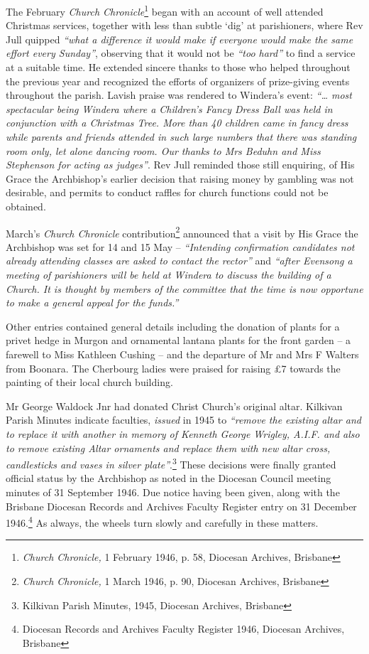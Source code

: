 The February \emph{Church Chronicle}\footnote{\emph{Church Chronicle,} 1 February 1946, p. 58, Diocesan Archives, Brisbane} began with an account of well attended Christmas services, together with less than subtle `dig' at parishioners, where Rev Jull quipped \emph{``what a difference it would make if everyone would make the same effort every Sunday''}, observing that it would not be \emph{``too hard''} to find a service at a suitable time. He extended sincere thanks to those who helped throughout the previous year and recognized the efforts of organizers of prize-giving events throughout the parish. Lavish praise was rendered to Windera's event: \emph{``\ldots{} most spectacular being Windera where a Children's Fancy Dress Ball was held in conjunction with a Christmas Tree. More than 40 children came in fancy dress while parents and friends attended in such large numbers that there was standing room only, let alone dancing room. Our thanks to Mrs Beduhn and Miss Stephenson for acting as judges''}. Rev Jull reminded those still enquiring, of His Grace the Archbishop's earlier decision that raising money by gambling was not desirable, and permits to conduct raffles for church functions could not be obtained.


March's \emph{Church Chronicle} contribution\footnote{\emph{Church Chronicle,} 1 March 1946, p. 90, Diocesan Archives, Brisbane} announced that a visit by His Grace the Archbishop was set for 14 and 15 May -- \emph{``Intending confirmation candidates not already attending classes are asked to contact the rector''} and \emph{``after Evensong a meeting of parishioners will be held at Windera to discuss the building of a Church. It is thought by members of the committee that the time is now opportune to make a general appeal for the funds.''}


Other entries contained general details including the donation of plants for a privet hedge in Murgon and ornamental lantana plants for the front garden -- a farewell to Miss Kathleen Cushing -- and the departure of Mr and Mrs F Walters from Boonara. The Cherbourg ladies were praised for raising \pounds7 towards the painting of their local church building.



Mr George Waldock Jnr had donated Christ Church's original altar. Kilkivan Parish Minutes indicate faculties, \emph{issued} in 1945 to \emph{``remove the existing altar and to replace it with another in memory of Kenneth George Wrigley, A.I.F. and also to remove existing Altar ornaments and replace them with new altar cross, candlesticks and vases in silver plate''}.\footnote{Kilkivan Parish Minutes, 1945, Diocesan Archives, Brisbane} These decisions were finally granted official status by the Archbishop as noted in the Diocesan Council meeting minutes of 31 September 1946. Due notice having been given, along with the Brisbane Diocesan Records and Archives Faculty Register entry on 31 December 1946.\footnote{Diocesan Records and Archives Faculty Register 1946, Diocesan Archives, Brisbane} As always, the wheels turn slowly and carefully in these matters.


